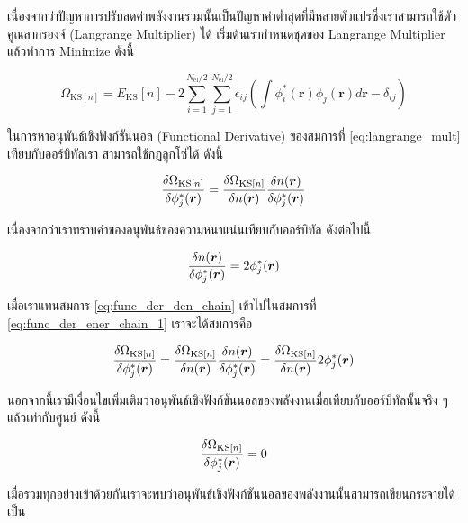 เนื่องจากว่าปัญหาการปรับลดค่าพลังงานรวมนั้นเป็นปัญหาค่าต่ำสุดที่มีหลายตัวแปรซึ่งเราสามารถใช้ตัวคูณลากรองจ์ (Langrange Multiplier) ได้
เริ่มต้นเรากำหนดชุดของ Langrange Multiplier แล้วทำการ Minimize ดังนี้

\begin{equation}\label{eq:langrange_mult}
    \Omega_{\text{KS}[n]} = E_{\text{KS}}[n] - 2 \sum^{N_{\text{el}}/2}_{i=1} \sum^{N_{\text{el}}/2}_{j=1}
    \epsilon_{ij} \left ( \int \phi^{\ast}_{i}(\bm{r}) \phi_{j}(\bm{r}) d\bm{r} - \delta_{ij} \right )
\end{equation}

\noindent ในการหาอนุพันธ์เชิงฟังก์ชันนอล (Functional Derivative) ของสมการที่ \eqref{eq:langrange_mult} เทียบกับออร์บิทัลเรา%
สามารถใช้กฎลูกโซ่ได้ ดังนี้

\begin{equation}\label{eq:func_der_ener_chain_1}
    \fdv{\Omega_{\text{KS}[n]}}{\phi^{\ast}_{j}(\bm{r})} = \fdv{\Omega_{\text{KS}[n]}}{n(\bm{r})}
    \fdv{n(\bm{r})}{\phi^{\ast}_{j}(\bm{r})}
\end{equation}

\noindent เนื่องจากว่าเราทราบค่าของอนุพันธ์ของความหนาแน่นเทียบกับออร์บิทัล ดังต่อไปนี้

\begin{equation}\label{eq:func_der_den_chain}
    \fdv{n(\bm{r})}{\phi^{\ast}_{j}(\bm{r})} = 2 \phi^{\ast}_{j}(\bm{r})
\end{equation}

\noindent เมื่อเราแทนสมการ \eqref{eq:func_der_den_chain} เข้าไปในสมการที่ \eqref{eq:func_der_ener_chain_1} เราจะได้สมการคือ

\begin{equation}\label{eq:func_der_ener_chain_2}
    \fdv{\Omega_{\text{KS}[n]}}{\phi^{\ast}_{j}(\bm{r})} = \fdv{\Omega_{\text{KS}[n]}}{n(\bm{r})}
    \fdv{n(\bm{r})}{\phi^{\ast}_{j}(\bm{r})} = \fdv{\Omega_{\text{KS}[n]}}{n(\bm{r})} 2 \phi^{\ast}_{j}(\bm{r})
\end{equation}

\noindent นอกจากนี้เรามีเงื่อนไขเพิ่มเติมว่าอนุพันธ์เชิงฟังก์ชันนอลของพลังงานเมื่อเทียบกับออร์บิทัลนั้นจริง ๆ แล้วเท่ากับศูนย์ ดังนี้

\begin{equation}\label{eq:func_der_ener_chain_zero}
    \fdv{\Omega_{\text{KS}[n]}}{\phi^{\ast}_{j}(\bm{r})} = 0
\end{equation}

เมื่อรวมทุกอย่างเข้าด้วยกันเราจะพบว่าอนุพันธ์เชิงฟังก์ชันนอลของพลังงานนั้นสามารถเขียนกระจายได้เป็น

